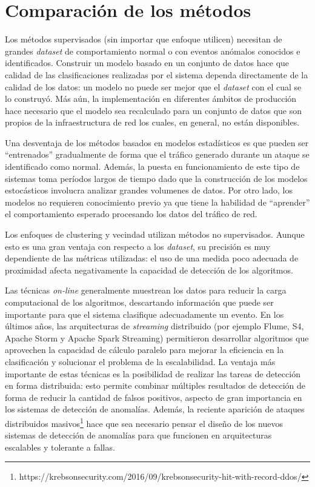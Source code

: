 \documentclass[a4paper,10pt, oneside]{article}
\begin{document}
\section{Comparación de los métodos}
Los métodos supervisados (sin importar que enfoque utilicen) necesitan de grandes \textit{dataset} de comportamiento normal o con eventos anómalos conocidos e identificados. Construir un modelo basado en un conjunto de datos hace que calidad de las clasificaciones realizadas por el sistema dependa directamente de la calidad de los datos: un modelo no puede ser mejor que el \textit{dataset} con el cual se lo construyó. Más aún, la implementación en diferentes ámbitos de producción hace necesario que el modelo sea recalculado para un conjunto de datos que son propios de la infraestructura de red los cuales, en general, no están disponibles.\par
Una desventaja de los métodos basados en modelos estadísticos es que pueden ser ``entrenados'' gradualmente de forma que el tráfico generado durante un ataque se identificado como normal. Además, la puesta en funcionamiento de este tipo de sistemas toma períodos largos de tiempo dado que la construcción de los modelos estocásticos involucra analizar grandes volumenes de datos. Por otro lado, los modelos no requieren conocimiento previo ya que tiene la habilidad de ``aprender'' el comportamiento esperado procesando los datos del tráfico de red\cite{journals/comsur/BhuyanBK14}.\par
Los enfoques de clustering y vecindad utilizan métodos no supervisados. Aunque esto es una gran ventaja con respecto a los \textit{dataset}, su precisión es muy dependiente de las métricas utilizadas: el uso de una medida poco adecuada de proximidad afecta negativamente la capacidad de detección de los algoritmos.\par
Las técnicas \textit{on-line} generalmente muestrean los datos para reducir la carga computacional de los algoritmos, descartando información que puede ser importante para que el sistema clasifique adecuadamente un evento. En los últimos años, las arquitecturas de \textit{streaming} distribuido (por ejemplo Flume\cite{apacheflume}, S4\cite{s4}, Apache Storm\cite{apachestorm} y Apache Spark Streaming\cite{apachespark}) permitieron desarrollar algoritmos que aprovechen la capacidad de cálculo paralelo para mejorar la eficiencia en la clasificación y solucionar el problema de la escalabilidad\cite{huang2014ld}. La ventaja más importante de estas técnicas es la posibilidad de realizar las tareas de detección en forma distribuida: esto permite combinar múltiples resultados de detección de forma de reducir la cantidad de falsos positivos, aspecto de gran importancia en los sistemas de detección de anomalías. Además, la reciente aparición de ataques distribuidos masivos\footnote{https://krebsonsecurity.com/2016/09/krebsonsecurity-hit-with-record-ddos/} hace que sea necesario pensar el diseño de los nuevos sistemas de detección de anomalías para que funcionen en arquitecturas escalables y tolerante a fallas.
\end{document}
